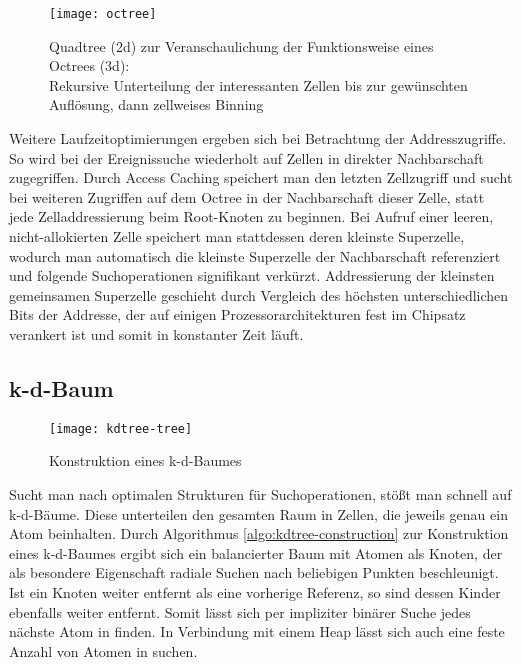 \begin{figure}[tbhp]
  \centering
  \texttt{[image: octree]}
  \label{fig:octree}
  \caption[Quadtree-Veranschaulichung eines Octrees]{Quadtree (2d) zur Veranschaulichung der Funktionsweise eines Octrees (3d):\\
    Rekursive Unterteilung der interessanten Zellen bis zur gewünschten Auflösung, dann zellweises Binning
}
\end{figure}

Weitere Laufzeitoptimierungen ergeben sich bei Betrachtung der Addresszugriffe.
So wird bei der Ereignissuche wiederholt auf Zellen in direkter Nachbarschaft zugegriffen.
Durch Access Caching speichert man den letzten Zellzugriff und sucht bei weiteren Zugriffen auf dem Octree in der Nachbarschaft dieser Zelle, statt jede Zelladdressierung beim Root-Knoten zu beginnen.
Bei Aufruf einer leeren, nicht-allokierten Zelle speichert man stattdessen deren kleinste Superzelle, wodurch man automatisch die kleinste Superzelle der Nachbarschaft referenziert und folgende Suchoperationen signifikant verkürzt.
Addressierung der kleinsten gemeinsamen Superzelle geschieht durch Vergleich des höchsten unterschiedlichen Bits der Addresse, der auf einigen Prozessorarchitekturen fest im Chipsatz verankert ist und somit in konstanter Zeit läuft.


\subsection{k-d-Baum}

\begin{figure}[bthp]
  \texttt{[image: kdtree-tree]}
  \caption[Konstruktion eines k-d-Baumes]{Konstruktion eines k-d-Baumes}
  \label{fig:kdtree}
\end{figure}

Sucht man nach optimalen Strukturen für Suchoperationen, stößt man schnell auf k-d-Bäume.
Diese unterteilen den gesamten Raum in Zellen, die jeweils genau ein Atom beinhalten.
Durch Algorithmus \ref{algo:kdtree-construction} zur Konstruktion eines k-d-Baumes ergibt sich ein balancierter Baum mit Atomen als Knoten, der als besondere Eigenschaft radiale Suchen nach beliebigen Punkten beschleunigt.
Ist ein Knoten weiter entfernt als eine vorherige Referenz, so sind dessen Kinder ebenfalls weiter entfernt.
Somit lässt sich per impliziter binärer Suche jedes nächste Atom in  finden.
In Verbindung mit einem Heap lässt sich auch eine feste Anzahl von Atomen in  suchen.

